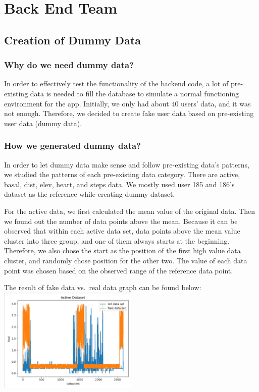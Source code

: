 \documentclass[]{book}
\begin{document}
\hypertarget{back-end-team}{%
\chapter{Back End Team}\label{back-end-team}}

\hypertarget{creation-of-dummy-data}{%
\section{Creation of Dummy Data}\label{creation-of-dummy-data}}

\hypertarget{why-do-we-need-dummy-data}{%
\subsection{Why do we need dummy data?}\label{why-do-we-need-dummy-data}}

In order to effectively test the functionality of the backend code, a lot of pre-existing data is needed to fill the database to simulate a normal functioning environment for the app. Initially, we only had about 40 users' data, and it was not enough. Therefore, we decided to create fake user data based on pre-existing user data (dummy data).

\hypertarget{how-we-generated-dummy-data}{%
\subsection{How we generated dummy data?}\label{how-we-generated-dummy-data}}

In order to let dummy data make sense and follow pre-existing data's patterns, we studied the patterns of each pre-existing data category. There are active, basal, dist, elev, heart, and steps data. We mostly used user 185 and 186's dataset as the reference while creating dummy dataset.

For the active data, we first calculated the mean value of the original data. Then we found out the number of data points above the mean. Because it can be observed that within each active data set, data points above the mean value cluster into three group, and one of them always starts at the beginning. Therefore, we also chose the start as the position of the first high value data cluster, and randomly chose position for the other two. The value of each data point was chosen based on the observed range of the reference data point.

The result of fake data vs.~real data graph can be found below:\\
\includegraphics[width=0.5\textwidth,height=\textheight]{./images/Active Data.JPG}
\end{document}
